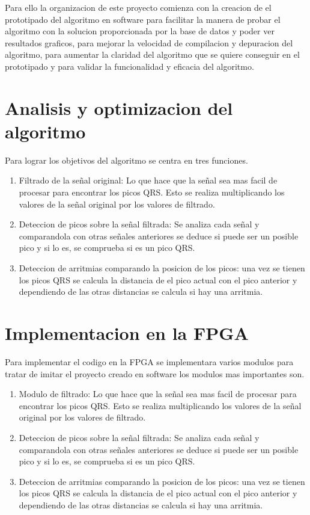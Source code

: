 Para ello la organizacion de este proyecto comienza con la creacion de el prototipado del algoritmo en software para facilitar
la manera de probar el algoritmo con la solucion proporcionada por la base de datos y poder ver resultados graficos, para mejorar
la velocidad de compilacion y depuracion del algoritmo, para aumentar la claridad del algoritmo que se quiere conseguir en el
prototipado y para validar la funcionalidad y eficacia del algoritmo.
\section{Analisis y optimizacion del algoritmo}
Para lograr los objetivos del algoritmo se centra en tres funciones.
\begin{enumerate}
	\item Filtrado de la señal original: Lo que hace que la señal sea mas facil de procesar para encontrar los picos QRS.
	 Esto se realiza multiplicando los valores de la señal original por los valores de filtrado.
	\item Deteccion de picos sobre la señal filtrada: Se analiza cada señal y comparandola con otras señales anteriores se
	 deduce si puede ser un posible pico y si lo es, se comprueba si es un pico QRS.
	\item Deteccion de arritmias comparando la posicion de los picos: una vez se tienen los picos QRS se calcula la distancia
	 de el pico actual con el pico anterior y dependiendo de las otras distancias se calcula si hay una arritmia.
\end{enumerate}


\section{Implementacion en la FPGA}
Para implementar el codigo en la FPGA se implementara varios modulos para tratar de imitar el proyecto creado en software 
los modulos mas importantes son.

	\begin{enumerate}
		\item Modulo de filtrado: Lo que hace que la señal sea mas facil de procesar para encontrar los picos QRS.
		Esto se realiza multiplicando los valores de la señal original por los valores de filtrado.
		\item Deteccion de picos sobre la señal filtrada: Se analiza cada señal y comparandola con otras señales anteriores se
		deduce si puede ser un posible pico y si lo es, se comprueba si es un pico QRS.
		\item Deteccion de arritmias comparando la posicion de los picos: una vez se tienen los picos QRS se calcula la distancia
		de el pico actual con el pico anterior y dependiendo de las otras distancias se calcula si hay una arritmia.
	\end{enumerate}

